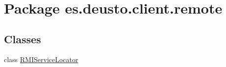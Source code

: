 \hypertarget{namespacees_1_1deusto_1_1client_1_1remote}{}\section{Package es.\+deusto.\+client.\+remote}
\label{namespacees_1_1deusto_1_1client_1_1remote}
\subsection*{Classes}
\begin{DoxyCompactItemize}
\item 
class \mbox{\hyperlink{classes_1_1deusto_1_1client_1_1remote_1_1_r_m_i_service_locator}{R\+M\+I\+Service\+Locator}}
\end{DoxyCompactItemize}

